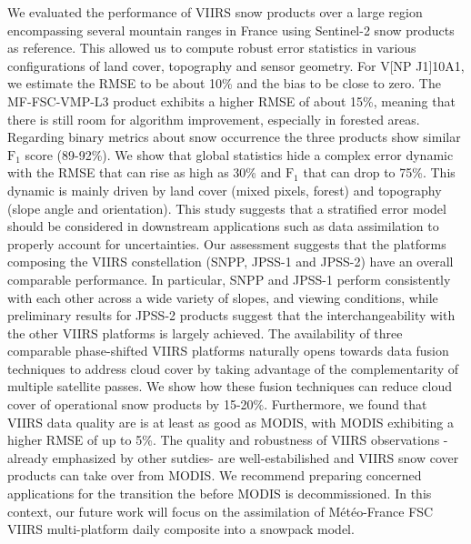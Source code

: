 \documentclass[tc, manuscript]{copernicus}
\begin{document}
\conclusions  %
\label{sec: conclusion}

We evaluated the performance of VIIRS snow products over a large region encompassing several mountain ranges in France using Sentinel-2 snow products as reference. This allowed us to compute robust error statistics in various configurations of land cover, topography and sensor geometry. For V[NP \textbar J1]10A1, we estimate the RMSE to be about 10\% and the bias to be close to zero. The MF-FSC-VMP-L3 product exhibits a higher RMSE of about 15\%, meaning that there is still room for algorithm improvement, especially in forested areas. Regarding binary metrics about snow occurrence the three products show similar $\mathrm{F_1}$ score (89-92\%). We show that global statistics hide a complex error dynamic with the RMSE that can rise as high as 30\% and $\mathrm{F_1}$ that can drop to 75\%. This dynamic is mainly driven by land cover (mixed pixels, forest) and topography (slope angle and orientation). This study suggests that a stratified error model should be considered in downstream applications such as data assimilation to properly account for uncertainties. Our assessment suggests that the platforms composing the VIIRS constellation (SNPP, JPSS-1 and JPSS-2) have an overall comparable performance. In particular, SNPP and JPSS-1 perform consistently with each other across a wide variety of slopes, and viewing conditions, while preliminary results for JPSS-2 products suggest that the interchangeability with the other VIIRS platforms is largely achieved. The availability of three comparable phase-shifted VIIRS platforms naturally opens towards data fusion techniques to address cloud cover by taking advantage of the complementarity of multiple satellite passes. We show how these fusion techniques can reduce cloud cover of operational snow products by 15-20\%. Furthermore, we found that VIIRS data quality are is at least as good as MODIS, with MODIS exhibiting a higher RMSE of up to 5\%. The quality and robustness of VIIRS observations -already emphasized by other sutdies- are well-estabilished and VIIRS snow cover products can take over from MODIS. We recommend preparing concerned applications for the transition the before MODIS is decommissioned. In this context, our future work will focus on the assimilation of Météo-France FSC VIIRS multi-platform daily composite into a snowpack model. 



\end{document}
